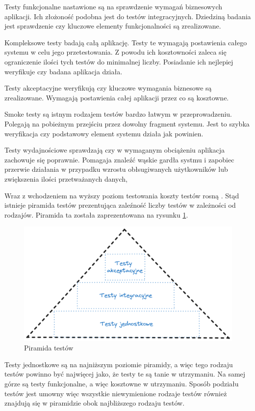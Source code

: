 Testy funkcjonalne nastawione są na sprawdzenie wymagań biznesowych aplikacji.
Ich złożoność podobna jest do testów integracyjnych.
Dziedziną badania jest sprawdzenie czy kluczowe elementy funkcjonalności są zrealizowane.

Kompleksowe testy badają całą aplikację.
Testy te wymagają postawienia całego systemu w celu jego przetestowania.
Z powodu ich kosztowności zaleca się ograniczenie ilości tych testów do minimalnej liczby.
Posiadanie ich nejlepiej weryfikuje czy badana aplikacja działa.

Testy akceptacyjne weryfikują czy kluczowe wymagania biznesowe są zrealizowane.
Wymagają postawienia całej aplikacji przez co są kosztowne.

Smoke testy są istnym rodzajem testów bardzo łatwym w przeprowadzeniu.
Polegają na pobieżnym przejściu przez dowolny fragment systemu.
Jest to szybka weryfikacja czy podstawowy element systemu działa jak powinien.

Testy wydajnościowe sprawdzają czy w wymaganym obciążeniu aplikacja zachowuje się poprawnie.
Pomagaja znaleźć wąskie gardła systmu i zapobiec przerwie działania w przypadku wzrostu obłsugiwanych użytkowników lub zwiększenia ilości przetważanych danych,

Wraz z wchodzeniem na wyższy poziom testowania koszty testów rosną \cite{testerzyPiramidaTestw}.
Stąd istnieje piramida testów prezentująca zaleźność liczby testów w zależności od rodzajów.
Piramida ta została zaprezentowana na rysunku \ref{rys:test-pyramid}.
\begin{figure}[!hb]
	\centering \includegraphics[width=1\linewidth]{rysunki/test-pyramid.png}
	\caption{Piramida testów}
	\label{rys:test-pyramid}
\end{figure}
Testy jednostkowe są na najniższym poziomie piramidy, a więc tego rodzaju testów powinno być najwięcej jako, że testy te są tanie w utrzymaniu.
Na samej górze są testy funkcjonalne, a więc kosztowne w utrzymaniu.
Sposób podziału testów jest umowny więc wszystkie niewymienione rodzaje testów również znajdują się w piramidzie obok najbliższego rodzaju testów.


